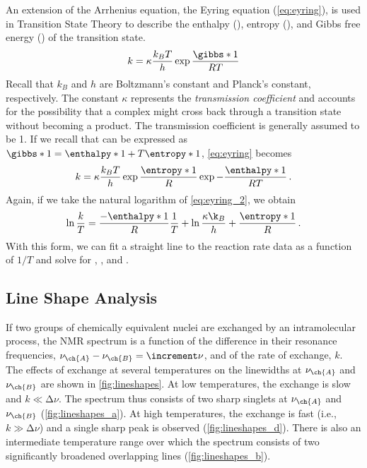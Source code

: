 An extension of the Arrhenius equation, the Eyring equation (\cref{eq:eyring}), is used in Transition State Theory to describe the enthalpy (), entropy (), and Gibbs free energy () of the transition state. 
\begin{equation}
  k = \kappa \frac{k_B T}{h} \exp{\frac{\gibbs*{1}}{RT}}
  \label{eq:eyring}
\end{equation}
Recall that \( k_B \) and \( h \) are Boltzmann's constant and Planck's constant, respectively. 
The constant \( \kappa \) represents the \emph{transmission coefficient} and accounts for the possibility that a complex might cross back through a transition state without becoming a product. 
The transmission coefficient is generally assumed to be \num{1}. 
If we recall that  can be expressed as \( \gibbs*{1} = \enthalpy*{1} + T \entropy*{1} \), \cref{eq:eyring} becomes 
\begin{equation}
  k = \kappa \frac{k_B T}{h} \exp{\frac{\entropy*{1}}{R}} \exp{-\frac{\enthalpy*{1}}{R T}} \, .
  \label{eq:eyring_2}
\end{equation}
Again, if we take the natural logarithm of \cref{eq:eyring_2}, we obtain
\begin{equation}
  \ln{\frac{k}{T}} = \frac{-\enthalpy*{1}}{R} \frac{1}{T} 
    + \ln{\frac{\kappa \k_B}{h}} + \frac{\entropy*{1}}{R} \, .
  \label{eq:eyring_linear}
\end{equation}
With this form, we can fit a straight line to the reaction rate data as a function of \( 1/T \) and solve for , , and . 


\subsection{Line Shape Analysis} %
\label{sub:line_shape_analysis}

If two groups of chemically equivalent nuclei are exchanged by an intramolecular process, the NMR spectrum is a function of the difference in their resonance frequencies, \( \nu_{\ch{A}} - \nu_{\ch{B}} = \increment\nu \), and of the rate of exchange, \( k \). 
The effects of exchange at several temperatures on the linewidths at \( \nu_{\ch{A}} \) and \( \nu_{\ch{B}} \) are shown in \cref{fig:lineshapes}. 
At low temperatures, the exchange is slow and \( k \ll \increment\nu \). 
The spectrum thus consists of two sharp singlets at \( \nu_{\ch{A}} \) and \( \nu_{\ch{B}} \) (\cref{fig:lineshapes_a}). 
At high temperatures, the exchange is fast (i.e., \( k \gg \increment\nu \)) and a single sharp peak is observed (\cref{fig:lineshapes_d}). 
There is also an intermediate temperature range over which the spectrum consists of two significantly broadened overlapping lines (\cref{fig:lineshapes_b}).


